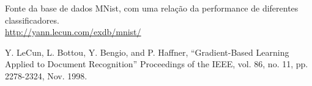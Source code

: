\documentclass[12pt, a4paper]{article}
\begin{document}
%
%
%
%


\begin{thebibliography}{99}

  Fonte da base de dados MNist, com uma relação da performance de diferentes classificadores.\\
  \url{http://yann.lecun.com/exdb/mnist/}

  Y. LeCun, L. Bottou, Y. Bengio, and P. Haffner, ``Gradient-Based Learning Applied to Document Recognition'' Proceedings of the IEEE, vol. 86, no. 11, pp. 2278-2324, Nov. 1998.
\end{thebibliography}
\end{document}
